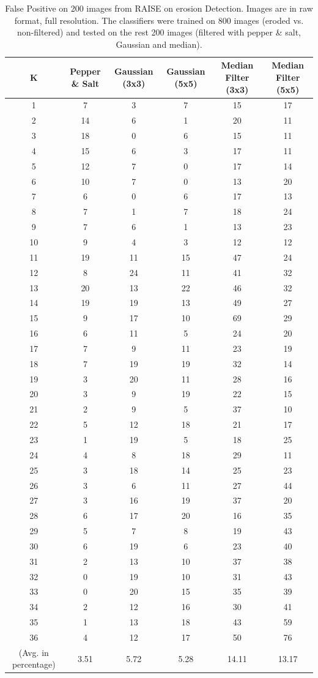 \documentclass[review]{elsarticle}
\begin{document}
\begin{table}[!t]
	\centering
	\caption{False Positive on 200 images from RAISE on erosion Detection. Images are in raw format, full resolution. The classifiers were trained on 800 images (eroded vs. non-filtered) and tested on the rest 200 images (filtered with pepper \& salt, Gaussian and median).}
	\label{table:attacks}
	\begin{tabular}{c|ccccc}
		\hline\hline
		K&Pepper \& Salt&Gaussian (3x3)&Gaussian (5x5)&Median Filter (3x3)&Median Filter (5x5)\\
		\hline
		1&7&3&7&15&17\\
		2&14&6&1&20&11\\
		3&18&0&6&15&11\\
		4&15&6&3&17&11\\
		5&12&7&0&17&14\\
		6&10&7&0&13&20\\
		7&6&0&6&17&13\\
		8&7&1&7&18&24\\
		9&7&6&1&13&23\\
		10&9&4&3&12&12\\
		11&19&11&15&47&24\\
		12&8&24&11&41&32\\
		13&20&13&22&46&32\\
		14&19&19&13&49&27\\
		15&9&17&10&69&29\\
		16&6&11&5&24&20\\
		17&7&9&11&23&19\\
		18&7&19&19&32&14\\
		19&3&20&11&28&16\\
		20&3&9&19&22&15\\
		21&2&9&5&37&10\\
		22&5&12&18&21&17\\
		23&1&19&5&18&25\\
		24&4&8&18&29&11\\
		25&3&18&14&25&23\\
		26&3&6&11&27&44\\
		27&3&16&19&37&20\\
		28&6&17&20&16&35\\
		29&5&7&8&19&43\\
		30&6&19&6&23&40\\
		31&2&13&10&37&38\\
		32&0&19&10&31&43\\
		33&0&20&15&35&39\\
		34&2&12&16&30&41\\
		35&1&13&18&43&59\\
		36&4&12&17&50&76\\
		\hline
		(Avg. in percentage)&3.51&5.72&5.28&14.11&13.17\\
		
		\hline\hline	
	\end{tabular}
\end{table}
\end{document}
